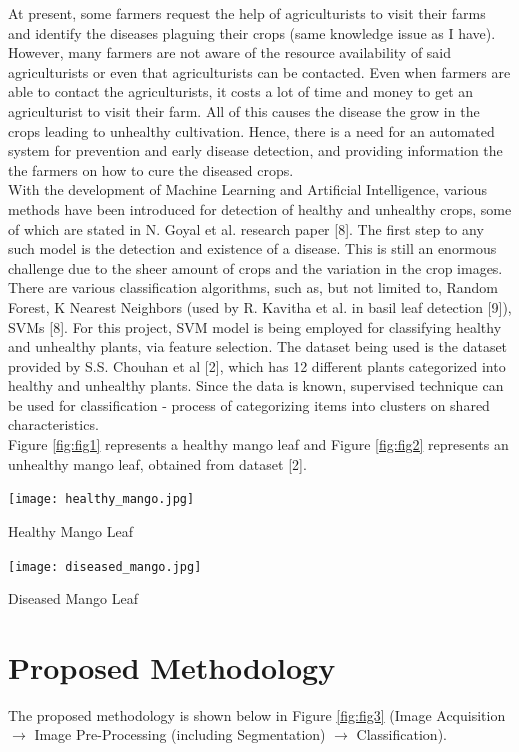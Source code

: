 \documentclass[twocolumn,10pt]{article}
\makeatletter
\newenvironment{figurehere}
  {\def\@captype{figure}}
  {}
\makeatother
\begin{document}
\begin{multicols}{2}
\begin{flushleft}
	At present, some farmers request the help of agriculturists to visit their farms and identify the diseases plaguing their crops (same knowledge issue as I have). However, many farmers are not aware of the resource availability of said agriculturists or even that agriculturists can be contacted. Even when farmers are able to contact the agriculturists, it costs a lot of time and money to get an agriculturist to visit their farm. All of this causes the disease the grow in the crops leading to unhealthy cultivation. Hence, there is a need for an automated system for prevention and early disease detection, and providing information the the farmers on how to cure the diseased crops.\\
	 With the development of Machine Learning and Artificial Intelligence, various methods have been introduced for detection of healthy and unhealthy crops, some of which are stated in N. Goyal et al. research paper [8]. The first step to any such model is the detection and existence of a disease. This is still an enormous challenge due to the sheer amount of crops and the variation in the crop images. There are various classification algorithms, such as, but not limited to, Random Forest, K Nearest Neighbors (used by R. Kavitha et al. in basil leaf detection [9]), SVMs [8]. For this project, SVM model is being employed for classifying healthy and unhealthy plants, via feature selection. The dataset being used is the dataset provided by S.S. Chouhan et al [2], which has 12 different plants categorized into healthy and unhealthy plants. Since the data is known, supervised technique can be used for classification - process of categorizing items into clusters on shared characteristics.\\
	Figure \ref{fig:fig1} represents a healthy mango leaf and Figure \ref{fig:fig2} represents an unhealthy mango leaf, obtained from dataset [2].
	
	\begin{figurehere}
		\centering
		\texttt{[image: healthy\_mango.jpg]}
		\caption{Healthy Mango Leaf}
		\label{fig:fig1}
	\end{figurehere}
	
	\begin{figurehere}
		\centering
		\texttt{[image: diseased\_mango.jpg]}
		\caption{Diseased Mango Leaf}
		\label{fig:fig2}
	\end{figurehere}
	
	\section{Proposed Methodology}
	The proposed methodology is shown below in Figure \ref{fig:fig3} (Image Acquisition $\rightarrow$ Image Pre-Processing (including Segmentation) $\rightarrow$ Classification).


\end{flushleft}
\end{multicols}
\end{document}
